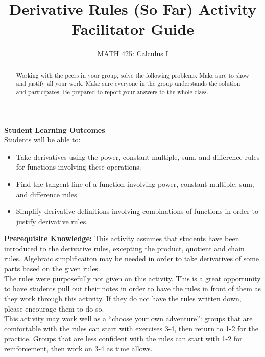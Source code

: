 \documentclass{ximera}
\title{Derivative Rules (So Far) Activity Facilitator Guide}
\author{MATH 425: Calculus I}
\begin{document}
\begin{abstract}
    Working with the peers in your group, solve the following problems. Make sure to show and justify all your work. Make sure everyone in the group understands the solution and participates. Be prepared to report your answers to the whole class. 
\end{abstract}
\maketitle

\textbf{Student Learning Outcomes}\\
Students will be able to: 
    \begin{itemize}
        \item Take derivatives using the power, constant multiple, sum, and difference rules for functions involving these operations.
        \item Find the tangent line of a function involving power, constant multiple, sum, and difference rules.
        \item Simplify derivative definitions involving combinations of functions in order to justify derivative rules.
    \end{itemize}

\textbf{Prerequisite Knowledge:}  This activity assumes that students have been introduced to the derivative rules, excepting the product, quotient and chain rules.  Algebraic simplificaiton may be needed in order to take derivatives of some parts based on the given rules.  \\

The rules were purposefully not given on this activity.  This is a great opportunity to have students pull out their notes in order to have the rules in front of them as they work through this activity.  If they do not have the rules written down, please encourage them to do so.  \\

This activity may work well as a ``choose your own adventure'': groups that are comfortable with the rules can start with exercises 3-4, then return to 1-2 for the practice.  Groups that are less confident with the rules can start with 1-2 for reinforcement, then work on 3-4 as time allows.  
\end{document}
